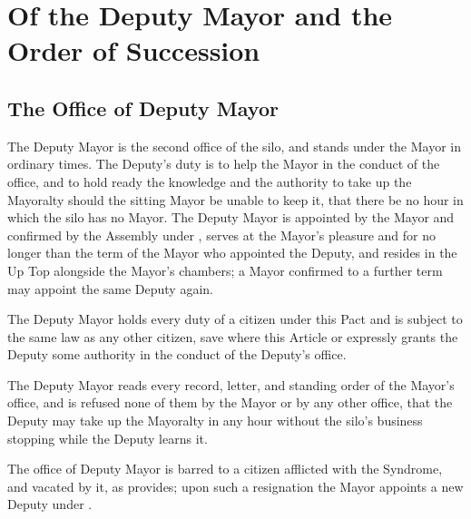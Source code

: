 \chapter{Of the Deputy Mayor and the Order of Succession}
\label{art:succession}


\section{The Office of Deputy Mayor}
\label{sec:succession:office-of-deputy-mayor}

The Deputy Mayor is the second office of the silo, and stands under the Mayor in ordinary times. The Deputy's duty is to help the Mayor in the conduct of the office, and to hold ready the knowledge and the authority to take up the Mayoralty should the sitting Mayor be unable to keep it, that there be no hour in which the silo has no Mayor. The Deputy Mayor is appointed by the Mayor and confirmed by the Assembly under , serves at the Mayor's pleasure and for no longer than the term of the Mayor who appointed the Deputy, and resides in the Up Top alongside the Mayor's chambers; a Mayor confirmed to a further term may appoint the same Deputy again.

\begin{clauses}
\item The Deputy Mayor holds every duty of a citizen under this Pact and is subject to the same law as any other citizen, save where this Article or  expressly grants the Deputy some authority in the conduct of the Deputy's office.
\item The Deputy Mayor reads every record, letter, and standing order of the Mayor's office, and is refused none of them by the Mayor or by any other office, that the Deputy may take up the Mayoralty in any hour without the silo's business stopping while the Deputy learns it.
\item The office of Deputy Mayor is barred to a citizen afflicted with the Syndrome, and vacated by it, as  provides; upon such a resignation the Mayor appoints a new Deputy under .
\end{clauses}

